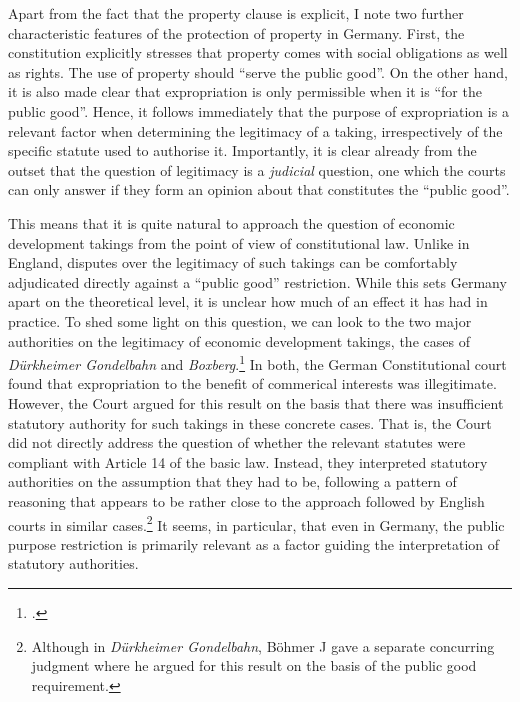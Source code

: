 Apart from the fact that the property clause is explicit, I note two further characteristic features of the protection of property in Germany. First, the constitution explicitly stresses that property comes with social obligations as well as rights. The use of property should ``serve the public good''. On the other hand, it is also made clear that expropriation is only permissible when it is ``for the public good''. Hence, it follows immediately that the purpose of expropriation is a relevant factor when determining the legitimacy of a taking, irrespectively of the specific statute used to authorise it. Importantly, it is clear already from the outset that the question of legitimacy is a \emph{judicial} question, one which the courts can only answer if they form an opinion about that constitutes the ``public good''. 

This means that it is quite natural to approach the question of economic development takings from the point of view of constitutional law. Unlike in England, disputes over the legitimacy of such takings can be comfortably adjudicated directly against a ``public good'' restriction. While this sets Germany apart on the theoretical level, it is unclear how much of an effect it has had in practice. To shed some light on this question, we can look to the two major authorities on the legitimacy of economic development takings, the cases of {\it Dürkheimer Gondelbahn} and {\it Boxberg}.\footcite{boxberg85,} In both, the German Constitutional court found that expropriation to the benefit of commerical interests was illegitimate. However, the Court argued for this result on the basis that there was insufficient statutory authority for such takings in these concrete cases. That is, the Court did not directly address the question of whether the relevant statutes were compliant with Article 14 of the basic law. Instead, they interpreted statutory authorities on the assumption that they had to be, following a pattern of reasoning that appears to be rather close to the approach followed by English courts in similar cases.\footnote{Although in {\it Dürkheimer Gondelbahn}, Böhmer J gave a separate concurring judgment where he argued for this result on the basis of the public good requirement.} It seems, in particular, that even in Germany, the public purpose restriction is primarily relevant as a factor guiding the interpretation of statutory authorities.

